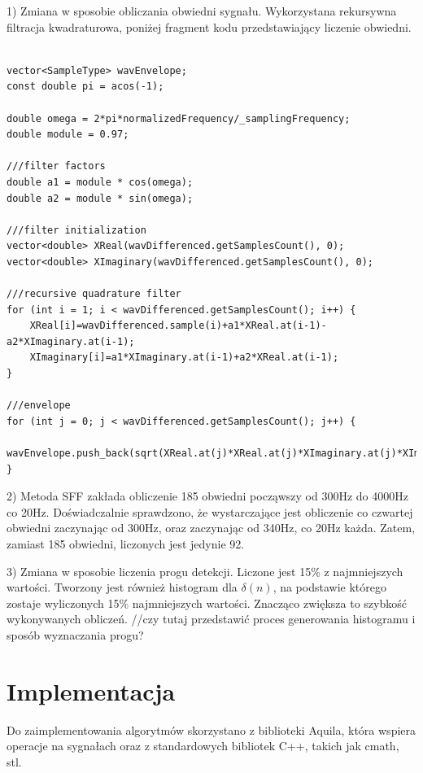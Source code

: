 \documentclass[eng,printmode]{mgr}
\begin{document}
1) Zmiana w sposobie obliczania obwiedni sygnału. Wykorzystana rekursywna filtracja kwadraturowa, poniżej fragment kodu przedstawiający liczenie obwiedni.

\lstset{language=C++,basicstyle=\scriptsize}
\begin{lstlisting}

vector<SampleType> wavEnvelope;
const double pi = acos(-1);

double omega = 2*pi*normalizedFrequency/_samplingFrequency;
double module = 0.97;

///filter factors
double a1 = module * cos(omega);
double a2 = module * sin(omega);

///filter initialization
vector<double> XReal(wavDifferenced.getSamplesCount(), 0);
vector<double> XImaginary(wavDifferenced.getSamplesCount(), 0);

///recursive quadrature filter
for (int i = 1; i < wavDifferenced.getSamplesCount(); i++) {
	XReal[i]=wavDifferenced.sample(i)+a1*XReal.at(i-1)-a2*XImaginary.at(i-1);
	XImaginary[i]=a1*XImaginary.at(i-1)+a2*XReal.at(i-1);
}

///envelope
for (int j = 0; j < wavDifferenced.getSamplesCount(); j++) {
	wavEnvelope.push_back(sqrt(XReal.at(j)*XReal.at(j)*XImaginary.at(j)*XImaginary.at(j)));
}

\end{lstlisting}\vspace{5mm}

2) Metoda SFF zakłada obliczenie 185 obwiedni począwszy od 300Hz do 4000Hz co 20Hz. Doświadczalnie sprawdzono, że wystarczające jest obliczenie co czwartej obwiedni zaczynając od 300Hz, oraz zaczynając od 340Hz, co 20Hz każda. Zatem, zamiast 185 obwiedni, liczonych jest jedynie 92. \vspace{5mm}

3) Zmiana w sposobie liczenia progu detekcji. Liczone jest 15\% z najmniejszych wartości. Tworzony jest również histogram dla $\delta(n)$, na podstawie którego zostaje wyliczonych 15\% najmniejszych wartości. Znacząco zwiększa to szybkość wykonywanych obliczeń.\vspace{5mm}
//czy tutaj przedstawić proces generowania histogramu i sposób wyznaczania progu?



\chapter{Implementacja}
Do zaimplementowania algorytmów skorzystano z biblioteki Aquila, która wspiera operacje na sygnałach oraz z standardowych bibliotek C++, takich jak cmath, stl.
\end{document}
